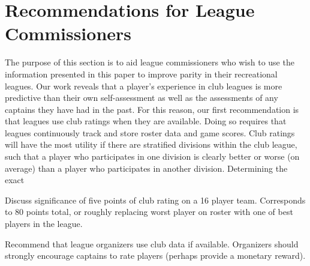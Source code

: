\section{Recommendations for League Commissioners}\label{sec:recommendations}

The purpose of this section is to aid league commissioners who wish to use the information presented in this paper to improve parity in their recreational leagues. Our work reveals that a player's experience in club leagues is more predictive than their own self-assessment as well as the assessments of any captains they have had in the past. For this reason, our first recommendation is that leagues use club ratings when they are available. Doing so requires that leagues continuously track and store roster data and game scores. Club ratings will have the most utility if there are stratified divisions within the club league, such that a player who participates in one division is clearly better or worse (on average) than a player who participates in another division. Determining the exact

Discuss significance of five points of club rating on a 16 player team.  Corresponds to 80 points total, or roughly replacing worst player on roster with one of best players in the league.

Recommend that league organizers use club data if available.  Organizers should strongly encourage captains to rate players (perhaps provide a monetary reward).